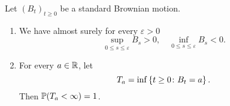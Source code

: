 \begin{thm}
    Let $(B_t)_{t \geq 0}$ be a standard Brownian motion.
    \begin{enumerate}[label=(\arabic{*})]
        \item We have almost surely for every $\varepsilon > 0$
        \begin{equation*}
            \sup_{0 \leq s \leq \varepsilon} B_s > 0,\quad \inf_{0 \leq s \leq \varepsilon} B_s < 0.
        \end{equation*}

        \item For every $a \in \mathbb{R}$, let
        \begin{equation*}
            T_a = \inf \left\{t \geq 0 \colon B_t = a\right\}.
        \end{equation*}
        Then $\mathbb{P}(T_a < \infty) = 1$.
    \end{enumerate}
\end{thm}

